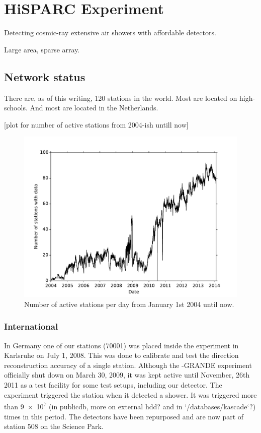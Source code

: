 \chapter{HiSPARC Experiment}
\label{ch:hisparc-experiment}

Detecting cosmic-ray extensive air showers with affordable detectors.

Large area, sparse array.


\section{Network status}

There are, as of this writing, 120 \hisaprc stations in the world. Most
are located on high-schools. And most are located in the Netherlands.

[plot for number of active stations from 2004-ish untill now]


\begin{figure}
    \centering
    \includegraphics[width=0.7\linewidth]{plots/network/number_of_stations_with_data_per_day}
    \caption{Number of active stations per day from January 1st 2004 until now.}
    \label{fig:number_of_stations_with_data_per_day}
\end{figure}


\subsection{International}

In Germany one of our stations (70001) was placed inside the \kascade
experiment in Karlsruhe on July 1, 2008. This was done to calibrate and
test the direction reconstruction accuracy of a single \hisaprc station.
Although the \kascade-GRANDE experiment officially shut down on March
30, 2009, it was kept active until November, 26th 2011 as a test
facility for some test setups, including our detector. The \kascade
experiment triggered the \hisparc station when it detected a shower. It
was triggered more than \num{9e7} (in publicdb, more on external hdd?
and in `/databases/kascade`?) times in this period. The detectors have
been repurposed and are now part of station 508 on the Science Park.

